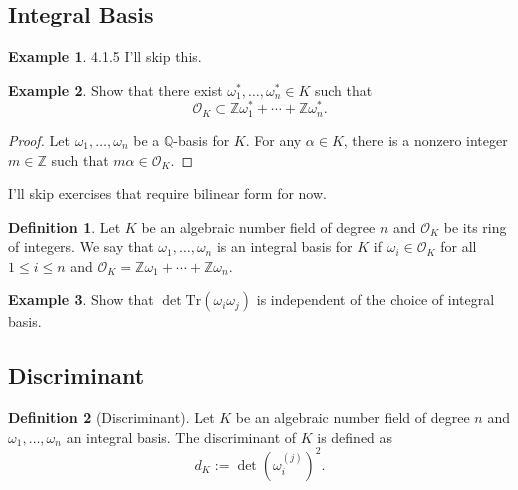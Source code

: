 \documentclass[a4paper]{book}
\theoremstyle{definition}
\newtheorem{definition}{Definition}[]
\newtheorem{example}{Example}[definition]
\begin{document}
\newpage
\subsection{Integral Basis}


\begin{example}
    4.1.5 I'll skip this.
\end{example}

\begin{example}
    Show that there exist \(\omega_1^*, \ldots, \omega_n^* \in K\) such that
    \begin{equation*}
        \mathcal{O}_K \subset \mathbb{Z}\omega_1^* + \cdots + \mathbb{Z} \omega_n^* \text{.}
    \end{equation*}
\end{example}
\begin{proof}
    Let \(\omega_1, \ldots, \omega_n\) be a \(\mathbb{Q}\)-basis for \(K\). For any \(\alpha \in K\), there is a nonzero integer \(m \in \mathbb{Z}\) such that \(m \alpha \in \mathcal{O}_K\).
\end{proof}

I'll skip exercises that require bilinear form for now.

\begin{defbox}
    \begin{definition}
        Let \(K\) be an algebraic number field of degree \(n\) and \(\mathcal{O}_K\) be its ring of integers. We say that \(\omega_1, \ldots, \omega_n\) is an integral basis for \(K\) if \(\omega_i \in \mathcal{O}_K\) for all \(1 \leq i \leq n\) and \(\mathcal{O}_K = \mathbb{Z}\omega_1 + \cdots + \mathbb{Z}\omega_n\).
    \end{definition}
\end{defbox}

\begin{example}
    Show that \(\det{\mathrm{Tr}(\omega_i \omega_j)}\) is independent of the choice of integral basis.
\end{example}

\newpage
\subsection{Discriminant}

\begin{defbox}
    \begin{definition}[Discriminant]
        Let \(K\) be an algebraic number field of degree \(n\) and \(\omega_1, \ldots, \omega_n\) an integral basis. The discriminant of \(K\) is defined as
        \begin{equation*}
            d_K := \det\left(\omega_i^{(j)}\right)^2 \text{.}
        \end{equation*}
    \end{definition}
\end{defbox}
\end{document}
